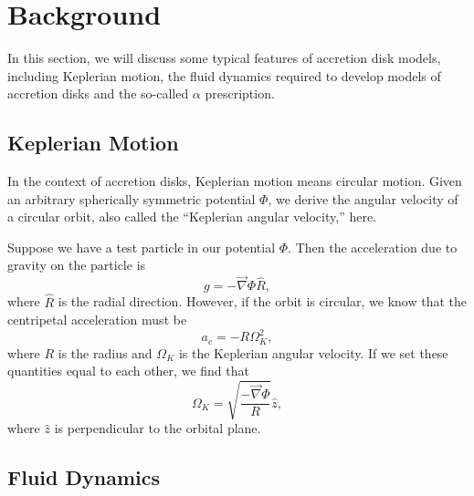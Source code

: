 \documentclass[]{article}
\newcommand{\myvec}[1]{\vec{#1}} %
\begin{document}
\section{Background}
\label{sec:background}

In this section, we will discuss some typical features of accretion
disk models, including Keplerian motion, the fluid dynamics required
to develop models of accretion disks and the so-called $\alpha$
prescription.

\subsection{Keplerian Motion}
\label{subsec:keplerian:motion}
In the context of accretion disks, Keplerian motion means circular
motion. Given an arbitrary spherically symmetric potential $\Phi$, we
derive the angular velocity of a circular orbit, also called the
``Keplerian angular velocity,'' here.

Suppose we have a test particle in our potential $\Phi$. Then the
acceleration due to gravity on the particle is
\begin{equation}
  \label{eq:acceleration:due:to:gravity}
  g = -\myvec{\nabla}\Phi \hat{R},
\end{equation}
where $\hat{R}$ is the radial direction. However, if the orbit is
circular, we know that the centripetal acceleration must be
\begin{equation}
  \label{eq:centripetalacceleration}
  a_c = -R \Omega_K^2,
\end{equation}
where $R$ is the radius and $\Omega_K$ is the Keplerian angular
velocity. If we set these quantities equal to each other, we find that
\begin{equation}
  \label{eq:keplerian:angular:velocity}
  \Omega_K = \sqrt{\frac{-\myvec{\nabla}\Phi}{R}}\hat{z},
\end{equation}
where $\hat{z}$ is perpendicular to the orbital plane.

\subsection{Fluid Dynamics}
\label{subsec:fluid:dynamics}
\end{document}

